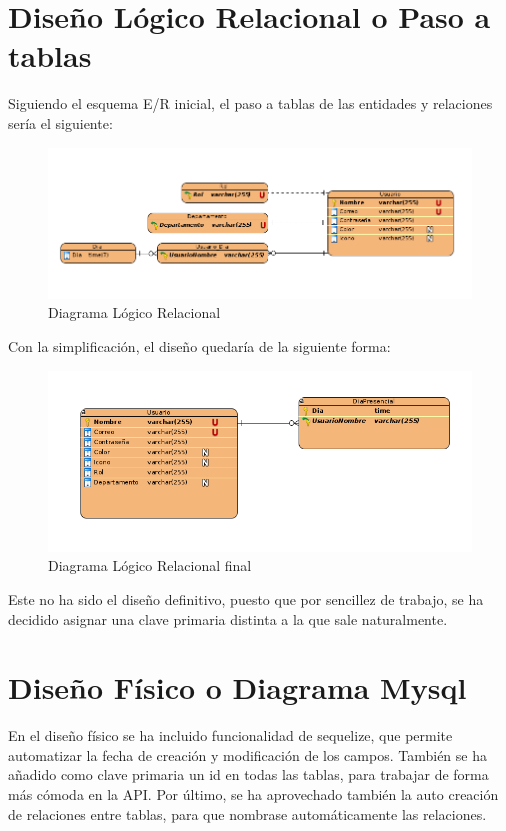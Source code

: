 \documentclass[11pt,spanish,listoffigures,listoftables]{tfgetsinf}
\begin{document}
\section{Diseño Lógico Relacional o Paso a tablas}
Siguiendo el esquema E/R inicial, el paso a tablas de las entidades y relaciones sería el siguiente:

\begin{figure}[h!] %
  \includegraphics[width=\linewidth]{img/pasotablas.png}
  \caption{Diagrama Lógico Relacional}
  \label{fig:diagramalr}
\end{figure}

Con la simplificación, el diseño quedaría de la siguiente forma:

\begin{figure}[h!] %
  \includegraphics[width=\linewidth]{img/DiagramaBBDDfinal.png}
  \caption{Diagrama Lógico Relacional final}
  \label{fig:diagramalrfinal}
\end{figure}

Este no ha sido el diseño definitivo, puesto que por sencillez de trabajo, se ha decidido asignar una clave primaria distinta a la que sale naturalmente.
\clearpage

\section{Diseño Físico o Diagrama Mysql}
En el diseño físico se ha incluido funcionalidad de sequelize, que permite automatizar la fecha de creación y modificación de los campos.
También se ha añadido como clave primaria un id en todas las tablas, para trabajar de forma más cómoda en la API.
Por último, se ha aprovechado también la auto creación de relaciones entre tablas, para que nombrase automáticamente las relaciones.
\end{document}
